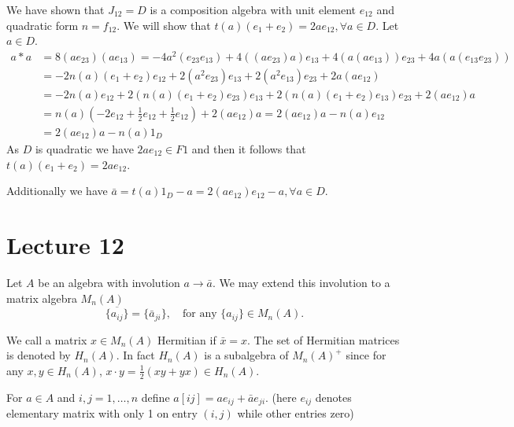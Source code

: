 \documentclass{article}
\begin{document}
We have shown that $J_{12} = D$ is a composition algebra with unit element $e_{12}$ and quadratic form $n = f_{12}$.  
We will show that $t(a)(e_1+e_2)=2ae_{12}, \forall a \in D$.  
Let $a \in D$.   
\begin{align*}  
    a*a &= 8(ae_{23})(ae_{13}) = -4a^2(e_{23}e_{13}) + 4((ae_{23})a)e_{13} + 4(a(ae_{13}))e_{23}+4a(a(e_{13}e_{23})) \\
    &= -2n(a)(e_1+e_2)e_{12} + 2(a^2 e_{23})e_{13} + 2(a^2e_{13})e_{23}+2a(ae_{12}) \\
    &= -2n(a)e_{12} + 2(n(a)(e_1+e_2)e_{23})e_{13}+2(n(a)(e_1+e_2)e_{13})e_{23} + 2(ae_{12})a \\
    &= n(a)(-2e_{12} + \frac{1}{2}e_{12} + \frac{1}{2}e_{12}) + 2(ae_{12})a = 2(ae_{12})a - n(a)e_{12} \\
    &= 2(ae_{12})a - n(a)1_D  
\end{align*}  
As $D$ is quadratic we have $2ae_{12} \in F1$ and then it follows that $t(a) (e_1+e_2)= 2ae_{12}$.  

Additionally we have $\bar{a} = t(a)1_D - a = 2(ae_{12})e_{12} - a, \forall a \in D$.  


\section{Lecture 12}

Let $A$ be an algebra with involution $a \to \bar{a}$. We may extend this involution to a matrix algebra $M_n(A)$  
\[ \overline{\{a_{ij}\}} = \{\bar{a}_{ji}\}, \quad \text{for any } \{a_{ij}\} \in M_n(A). \]  

We call a matrix $x \in M_n(A)$ Hermitian if $\bar{x}=x$. The set of Hermitian matrices is denoted by $H_n(A)$. In fact $H_n(A)$ is a subalgebra of $M_n(A)^+$ since for any $x,y \in H_n(A)$, $x \cdot y = \frac{1}{2}(xy+yx) \in H_n(A)$.  

For $a \in A$ and $i,j=1, \dots, n$ define $a[ij] = ae_{ij} + \bar{a} e_{ji}$. (here $e_{ij}$ denotes elementary matrix with only 1 on entry $(i,j)$ while other entries zero)
\end{document}
